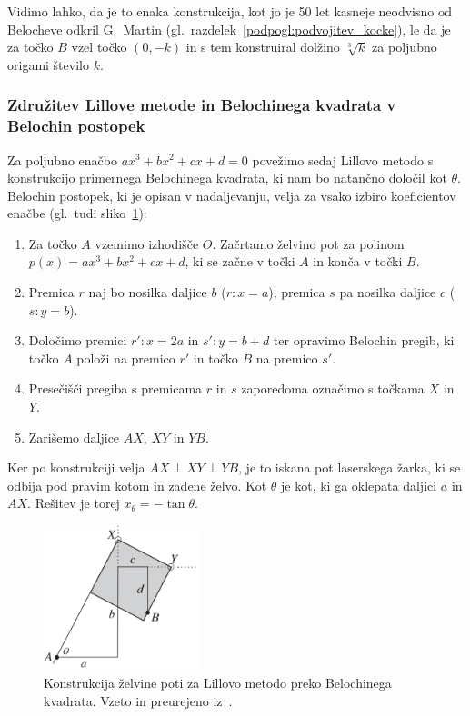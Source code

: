 Vidimo lahko, da je to enaka konstrukcija, kot jo je 50 let kasneje neodvisno od Belocheve odkril G.\ Martin (gl.\ razdelek~\ref{podpogl:podvojitev_kocke}), le da je za točko $B$ vzel točko $(0, -k)$ in s tem konstruiral dolžino $\sqrt[3]{k}$ za poljubno origami število $k$.

\subsubsection*{Združitev Lillove metode in Belochinega kvadrata v Belochin postopek}

Za poljubno enačbo $a x^3 + b x^2 + c x + d = 0$ povežimo sedaj Lillovo metodo s konstrukcijo primernega Belochinega kvadrata, ki nam bo natančno določil kot $\theta$. Belochin postopek, ki je opisan v nadaljevanju, velja za vsako izbiro koeficientov enačbe (gl.\ tudi sliko~\ref{fig:beloch_kubicna_resitev}):

\begin{enumerate}
    \item Za točko $A$ vzemimo izhodišče $O$. Začrtamo želvino pot za polinom $p(x) = a x^3 + b x^2 + c x + d$, ki se začne v točki $A$ in konča v točki $B$.
    \item Premica $r$ naj bo nosilka daljice $b$ ($r: x = a$), premica $s$ pa nosilka daljice $c$ ($s: y = b$).
    \item Določimo premici $r': x = 2a$ in $s': y = b + d$ ter opravimo Belochin pregib, ki točko $A$ položi na premico $r'$ in točko $B$ na premico $s'$.
    \item Presečišči pregiba s premicama $r$ in $s$ zaporedoma označimo s točkama $X$ in $Y$.
    \item Zarišemo daljice $AX$, $XY$ in $YB$.
\end{enumerate}

Ker po konstrukciji velja $ AX \perp XY \perp YB $, je to iskana pot laserskega žarka, ki se odbija pod pravim kotom in zadene želvo. Kot $\theta$ je kot, ki ga oklepata daljici $a$ in $AX$. Rešitev je torej $x_{\theta} = - \tan \theta$.

\begin{figure}[h]
    \centering
    \includegraphics[width=0.4\textwidth]{images/kubična enačba/beloch_kubicna_resitev.png}
    \caption[Lillova metoda z Belochinim kvadratom]{Konstrukcija želvine poti za Lillovo metodo preko Belochinega kvadrata. Vzeto in preurejeno iz~\cite[str.\ 313]{hull2011}.}
    \label{fig:beloch_kubicna_resitev}
\end{figure}

